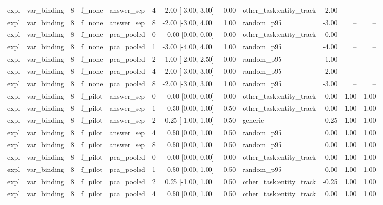 \begin{tabular}{llrllrrrlrrr}
expl & var\_binding & 8 & f\_none & answer\_sep & 4 & -2.00 [-3.00, 3.00] & 0.00 & other\_task:entity\_track & -2.00 & -- & -- \\
expl & var\_binding & 8 & f\_none & answer\_sep & 8 & -2.00 [-3.00, 4.00] & 1.00 & random\_p95 & -3.00 & -- & -- \\
expl & var\_binding & 8 & f\_none & pca\_pooled & 0 & -0.00 [0.00, 0.00] & -0.00 & other\_task:entity\_track & 0.00 & -- & -- \\
expl & var\_binding & 8 & f\_none & pca\_pooled & 1 & -3.00 [-4.00, 4.00] & 1.00 & random\_p95 & -4.00 & -- & -- \\
expl & var\_binding & 8 & f\_none & pca\_pooled & 2 & -1.00 [-2.00, 2.50] & 0.00 & random\_p95 & -1.00 & -- & -- \\
expl & var\_binding & 8 & f\_none & pca\_pooled & 4 & -2.00 [-3.00, 3.00] & 0.00 & random\_p95 & -2.00 & -- & -- \\
expl & var\_binding & 8 & f\_none & pca\_pooled & 8 & -2.00 [-3.00, 3.00] & 1.00 & random\_p95 & -3.00 & -- & -- \\
expl & var\_binding & 8 & f\_pilot & answer\_sep & 0 & 0.00 [0.00, 0.00] & 0.00 & other\_task:entity\_track & 0.00 & 1.00 & 1.00 \\
expl & var\_binding & 8 & f\_pilot & answer\_sep & 1 & 0.50 [0.00, 1.00] & 0.50 & other\_task:entity\_track & 0.00 & 1.00 & 1.00 \\
expl & var\_binding & 8 & f\_pilot & answer\_sep & 2 & 0.25 [-1.00, 1.00] & 0.50 & generic & -0.25 & 1.00 & 1.00 \\
expl & var\_binding & 8 & f\_pilot & answer\_sep & 4 & 0.50 [0.00, 1.00] & 0.50 & random\_p95 & 0.00 & 1.00 & 1.00 \\
expl & var\_binding & 8 & f\_pilot & answer\_sep & 8 & 0.50 [0.00, 1.00] & 0.50 & random\_p95 & 0.00 & 1.00 & 1.00 \\
expl & var\_binding & 8 & f\_pilot & pca\_pooled & 0 & 0.00 [0.00, 0.00] & 0.00 & other\_task:entity\_track & 0.00 & 1.00 & 1.00 \\
expl & var\_binding & 8 & f\_pilot & pca\_pooled & 1 & 0.50 [0.00, 1.00] & 0.50 & random\_p95 & 0.00 & 1.00 & 1.00 \\
expl & var\_binding & 8 & f\_pilot & pca\_pooled & 2 & 0.25 [-1.00, 1.00] & 0.50 & other\_task:entity\_track & -0.25 & 1.00 & 1.00 \\
expl & var\_binding & 8 & f\_pilot & pca\_pooled & 4 & 0.50 [0.00, 1.00] & 0.50 & other\_task:entity\_track & 0.00 & 1.00 & 1.00 \\

\end{tabular}
